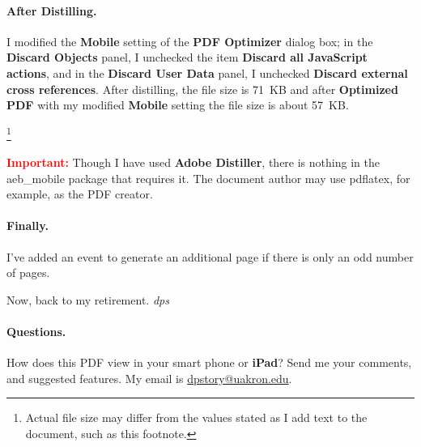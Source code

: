 \documentclass[\ifsmartphone12pt\fi,fleqn]{article}
\def\nlfootnote#1{\begin{NoHyper}\footnote{#1}\end{NoHyper}}
\begin{document}
\paragraph*{\color{blue}After Distilling.} I modified the \textbf{Mobile} setting
of the \textbf{\textsf{PDF} Optimizer} dialog box; in the \textbf{Discard
Objects} panel, I unchecked the item \textbf{Discard all Java\-Script
actions}, and in the \textbf{Discard User Data} panel, I unchecked
\textbf{Discard external cross references}. After distilling, the file
size is 71~KB and after \textbf{\textsf{Optimized \textsf{PDF}}} with my
modified \textbf{Mobile} setting the file size is about
57~KB.\nlfootnote{Actual file size may differ from the values stated as I
add text to the document, such as this footnote.}

\textbf{\textcolor{red}{Important:}} Though I have used \textbf{Adobe Distiller}, there is nothing in the \textsf{aeb\_mobile}
package that requires it. The document author may use \textsf{pdflatex}, for
example, as the PDF creator.

\paragraph*{\color{blue}Finally.}
I've added an \texttt{\string\AtEndDocument} event to generate an
additional page if there is only an odd number of pages.

Now, back to my retirement. \textsl{dps}

\bigbreak

\paragraph*{\color{red}Questions.}
How does this \textsf{PDF} view in your smart phone or
\textbf{\textsf{iPad}}? Send me your comments, and suggested features. My
email is \href{mailto:dpstory@uakron.edu}{dpstory@uakron.edu}.
\end{document}
